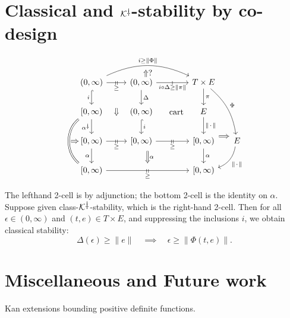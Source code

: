 \documentclass[11pt, one side, article]{memoir}
\theoremstyle{definition}
\theoremstyle{plain}
\newcommand{\cat}[1]{\mathcal{#1}}%
\newcommand{\ldag}{^{\rotatebox{180}{$\dagger$}}}
\newcommand{\blank}[1][1pt]{\hspace{#1}\cdot\hspace{#1}}
\newcommand{\K}{\cat{K}}
\newcommand{\Kdag}[1][0]{\K\ldag}
\newcommand{\tick}{\shortmid}
\newcommand{\ttick}{\shortmid\shortmid}
\begin{document}
\chapter{Classical and $\Kdag$-stability by co-design}
\label{}

\[
\begin{tikzcd}
	{(0,\infty)}
		\ar[d, hook, "i"']\ar[r, "\ttick"{marking, name=A1}, "\geq" below=1pt]
		\ar[rr, bend left=25pt, "i\geq \|\Phi\|", ""' name=D1]
	&
	|[alias=D2]|{(0,\infty)}
		\ar[d, "\Delta"]
		\ar[r, "\tick"{marking}, "i\circ\Delta\geq\|\pi\|"']
	&[15pt]
	T\times E
		\ar[d, "\pi"]\ar[ddr, bend left=20pt, "\Phi"]
	\\
	{[0,\infty)}
		\ar[dd, shift right=5pt, bend right=50pt, equal, "" name=C1]\ar[d, "\alpha\ldag"']
	&
	{(0,\infty)}
		\ar[d, hook, "i"]
	&
	E
		\ar[l, phantom, "\text{cart}"]
		\ar[d, "\|\blank\|"]
	\\
	|[alias=C2]|{[0,\infty)}
		\ar[r, "\ttick"{marking, name=A2}, "\geq" below=1pt]
		\ar[d, "\alpha"']
	&
	|[alias=B1]|{[0,\infty)}
		\ar[r, "\ttick"{marking}, "\geq" below=1pt]
	&
	{[0,\infty)}
		\ar[d, "\alpha"]\ar[r, Rightarrow, yshift=6pt, shorten=1pt]
	&[-10pt]
	E
		\ar[dl, bend left, "\|\blank\|"]
	\\
	{[0,\infty)}\ar[rr, "\ttick"{marking, name=B2}, "\geq" below=1pt]
	&&
	{[0,\infty)}
		\ar[from=A1, to=A2, Rightarrow, shorten=25pt]
		\ar[from=B1.south-|B2, to=B2, Rightarrow, shorten=3pt, "\alpha"]
		\ar[from=C1, to=C2, Rightarrow, shorten=-2pt]
		\ar[from=D1, to=D1|-D2, pos=.3, phantom, "\Uparrow?"]
\end{tikzcd}
\]

The lefthand 2-cell is by adjunction; the bottom 2-cell is the identity on $\alpha$. Suppose given class-$\Kdag$-stability, which is the right-hand 2-cell. Then for all $\epsilon\in(0,\infty)$ and $(t,e)\in T\times E$, and suppressing the inclusions $i$, we obtain classical stability:
\[
  \Delta(\epsilon)\geq \|e\|
  \quad\implies\quad
	\epsilon\geq\|\Phi(t,e)\|.
\]

\chapter{Miscellaneous and Future work}

Kan extensions bounding positive definite functions.
\end{document}
